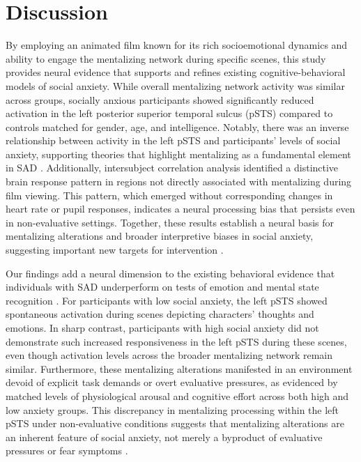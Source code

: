 

\section{Discussion}
By employing an animated film known for its rich socioemotional dynamics and ability to engage the mentalizing network during specific scenes, this study provides neural evidence that supports and refines existing cognitive-behavioral models of social anxiety. While overall mentalizing network activity was similar across groups, socially anxious participants showed significantly reduced activation in the left posterior superior temporal sulcus (pSTS) compared to controls matched for gender, age, and intelligence. Notably, there was an inverse relationship between activity in the left pSTS and participants' levels of social anxiety, supporting theories that highlight mentalizing as a fundamental element in SAD \citep{hezel2014,baez2023}. Additionally, intersubject correlation analysis identified a distinctive brain response pattern in regions not directly associated with mentalizing during film viewing. This pattern, which emerged without corresponding changes in heart rate or pupil responses, indicates a neural processing bias that persists even in non-evaluative settings. Together, these results establish a neural basis for mentalizing alterations and broader interpretive biases in social anxiety, suggesting important new targets for intervention \citep{clark1995,rapee1997}.

Our findings add a neural dimension to the existing behavioral evidence that individuals with SAD underperform on tests of emotion and mental state recognition \citep{baez2023}. For participants with low social anxiety, the left pSTS showed spontaneous activation during scenes depicting characters' thoughts and emotions. In sharp contrast, participants with high social anxiety did not demonstrate such increased responsiveness in the left pSTS during these scenes, even though activation levels across the broader mentalizing network remain similar. Furthermore, these mentalizing alterations manifested in an environment devoid of explicit task demands or overt evaluative pressures, as evidenced by matched levels of physiological arousal and cognitive effort across both high and low anxiety groups. This discrepancy in mentalizing processing within the left pSTS under non-evaluative conditions suggests that mentalizing alterations are an inherent feature of social anxiety, not merely a byproduct of evaluative pressures or fear symptoms \citep{hezel2014}.

